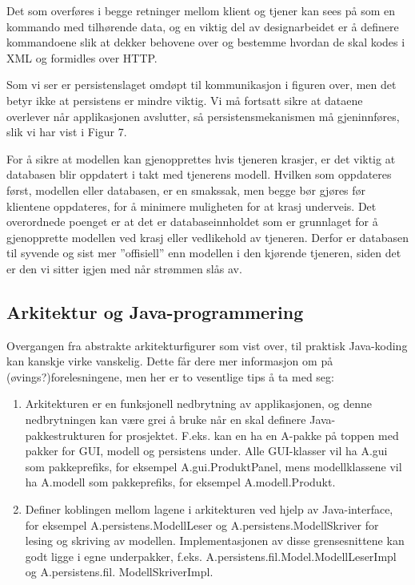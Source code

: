 \documentclass[a4paper]{scrartcl}
\begin{document}
Det som overføres i begge retninger mellom klient og tjener kan sees på som en kommando med tilhørende data, og en viktig del av designarbeidet er å definere kommandoene slik at dekker behovene over og bestemme hvordan de skal kodes i XML og formidles over HTTP.

Som vi ser er persistenslaget omdøpt til kommunikasjon i figuren over, men det betyr ikke at persistens er mindre viktig. Vi må fortsatt sikre at dataene overlever når applikasjonen avslutter, så persistensmekanismen må gjeninnføres, slik vi har vist i Figur 7.

For å sikre at modellen kan gjenopprettes hvis tjeneren krasjer, er det viktig at databasen blir oppdatert i takt med tjenerens modell. Hvilken som oppdateres først, modellen eller databasen, er en smakssak, men begge bør gjøres før klientene oppdateres, for å minimere muligheten for at krasj underveis. Det overordnede poenget er at det er databaseinnholdet som er grunnlaget for å gjenopprette modellen ved krasj eller vedlikehold av tjeneren. Derfor er databasen til syvende og sist mer ”offisiell” enn modellen i den kjørende tjeneren, siden det er den vi sitter igjen med når strømmen slås av.

\subsection{Arkitektur og Java-programmering}

Overgangen fra abstrakte arkitekturfigurer som vist over, til praktisk Java-koding kan kanskje virke vanskelig. Dette får dere mer informasjon om på (øvings?)forelesningene, men her er to vesentlige tips å ta med seg:

\begin{enumerate}

\item
Arkitekturen er en funksjonell nedbrytning av applikasjonen, og denne nedbrytningen kan være grei å bruke når en skal definere Java-pakkestrukturen for prosjektet. F.eks. kan en ha en A-pakke på toppen med pakker for GUI, modell og persistens under. Alle GUI-klasser vil ha A.gui som pakkeprefiks, for eksempel A.gui.ProduktPanel, mens modellklassene vil ha A.modell som pakkeprefiks, for eksempel A.modell.Produkt.

\item
Definer koblingen mellom lagene i arkitekturen ved hjelp av Java-interface, for eksempel A.persistens.ModellLeser og A.persistens.ModellSkriver for lesing og skriving av modellen. Implementasjonen av disse grensesnittene kan godt ligge i egne underpakker, f.eks. A.persistens.fil.Model.ModellLeserImpl og A.persistens.fil. ModellSkriverImpl.

\end{enumerate}
\end{document}
